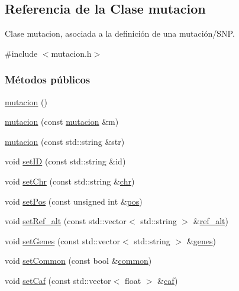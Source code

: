 \hypertarget{classmutacion}{}\subsection{Referencia de la Clase mutacion}
\label{classmutacion}


Clase mutacion, asociada a la definición de una mutación/\+S\+NP.  




{\ttfamily \#include $<$mutacion.\+h$>$}

\subsubsection*{Métodos públicos}
\begin{DoxyCompactItemize}
\item 
\hyperlink{classmutacion_a01cb8b2307eacbfb415f99373ff3c64a}{mutacion} ()
\item 
\hyperlink{classmutacion_a6bcb17c723a359ffac7dda8d5d427dfe}{mutacion} (const \hyperlink{classmutacion}{mutacion} \&m)
\item 
\hyperlink{classmutacion_a068152cf240f2e103a2ae8f0e74d417b}{mutacion} (const std\+::string \&str)
\item 
void \hyperlink{classmutacion_a2d8e311c4cf28c0f73e4624d76003f28}{set\+ID} (const std\+::string \&id)
\item 
void \hyperlink{classmutacion_a2b9701a4642e1e80bff5fc2aed37b9be}{set\+Chr} (const std\+::string \&\hyperlink{classmutacion_ab69021961d68dd5232b4bc3f849ddf13}{chr})
\item 
void \hyperlink{classmutacion_a2667189a28d3ac983a8f63ca92e81fba}{set\+Pos} (const unsigned int \&\hyperlink{classmutacion_ae1487b8648d0eaad68de5e4e5a87f3ff}{pos})
\item 
void \hyperlink{classmutacion_a7d9d8ad34e7710347de5dd069da11df7}{set\+Ref\+\_\+alt} (const std\+::vector$<$ std\+::string $>$ \&\hyperlink{classmutacion_a79091ce22a92f1994070a37916304d55}{ref\+\_\+alt})
\item 
void \hyperlink{classmutacion_aa2974fb50042dbfd679440b917231867}{set\+Genes} (const std\+::vector$<$ std\+::string $>$ \&\hyperlink{classmutacion_a40212ce0822ff41c32ac82156094af69}{genes})
\item 
void \hyperlink{classmutacion_ab62d36e9bad78d43ace74fdaec909ca6}{set\+Common} (const bool \&\hyperlink{classmutacion_a6dabfef6167d64030f095887b15f65dd}{common})
\item 
void \hyperlink{classmutacion_a447b9009932a64b2ed6269ed2577f865}{set\+Caf} (const std\+::vector$<$ float $>$ \&\hyperlink{classmutacion_aef3fe46b6a2d10e3993703ebd5d5be5f}{caf})

\end{DoxyCompactItemize}
